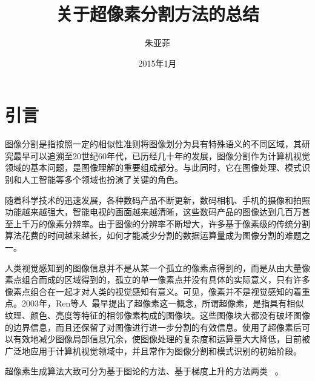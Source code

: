 \documentclass[12pt]{article}
\begin{document}
\title{\vspace{-2em}关于超像素分割方法的总结\vspace{-0.7em}}
\author{朱亚菲}
\date{\vspace{-0.7em}2015年1月\vspace{-0.7em}}
\maketitle\thispagestyle{fancy}
\maketitle
\tableofcontents 


\section{引言}

图像分割是指按照一定的相似性准则将图像划分为具有特殊语义的不同区域，其研究最早可以追溯至20世纪60年代，已历经几十年的发展，图像分割作为计算机视觉领域的基本问题，是图像理解的重要组成部分。与此同时，它在图像处理、模式识别和人工智能等多个领域也扮演了关键的角色。

随着科学技术的迅速发展，各种数码产品不断更新，数码相机、手机的摄像和拍照功能越来越强大，智能电视的画面越来越清晰，这些数码产品的图像达到几百万甚至上千万的像素分辨率。由于图像的分辨率不断增大，许多基于像素级的传统分割算法花费的时间越来越长，如何才能减少分割的数据运算量成为图像分割的难题之一。

人类视觉感知到的图像信息并不是从某一个孤立的像素点得到的，而是从由大量像素点组合而成的区域得到的，孤立的单一像素点并没有具体的实际意义，只有许多像素点组合在一起才对人类的视觉感知有意义。可见，像素并不是视觉感知的着重点。2003年，Ren等人~\cite{ren2003learning}最早提出了超像素这一概念，所谓超像素，是指具有相似纹理、颜色、亮度等特征的相邻像素构成的图像块。这些图像块大都没有破坏图像的边界信息，而且还保留了对图像进行进一步分割的有效信息。使用了超像素后可以有效地减少图像局部信息冗余，使图像处理的复杂度和运算量大大降低，目前被广泛地应用于计算机视觉领域中，并且常作为图像分割和模式识别的初始阶段。

超像素生成算法大致可分为基于图论的方法、基于梯度上升的方法两类~\cite{achanta2012slic} 。
\end{document}
